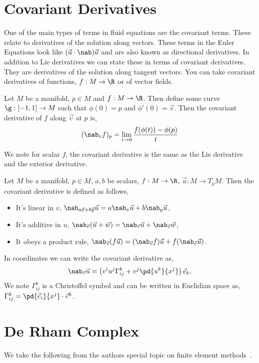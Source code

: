 \section{Covariant Derivatives}
One of the main types of terms in fluid equations are the covariant terms. These relate to derivatives of the solution along vectors. These terms in the Euler Equations look like $(\vec u \cdot \nab)\vec u$ and are also known as directional derivatives. In addition to Lie derivatives we can state these in terms of covariant derivatives. They are derivatives of the solution along tangent vectors. You can take covariant derivatives of functions, $f : M \to \R$ or of vector fields.
\begin{ndefi}
  Let $M$ be a manifold, $p \in M$ and $f : M \to \R$. Then define some curve $\g : [-1, 1] \to M$ such that $\phi(0) = p$ and $\phi'(0) = \vec v$. Then the covariant derivative of $f$ along $\vec v$ at $p$ is,
  $$ (\nab_v f)_p = \lim_{t \to 0}\frac{f(\phi(t)) - \phi(p)}{t} $$
\end{ndefi}
\noindent
We note for scalar $f$, the covariant derivative is the same as the Lie derivative and the exterior derivative.

\begin{ndefi}
  Let $M$ be a manifold, $p \in M$, $a,b$ be scalars, $f : M \to \R$, $\vec u : M \to T_pM$. Then the covariant derivative is defined as follows,
  \begin{itemize}
    \item It's linear in $v$, $\nab_{a\vec x + b\vec y}\vec u = a\nab_x\vec u + b\nab_y \vec u $,
    \item It's additive in $u$, $\nab_{\vec v} (\vec u + \vec w) = \nab_{\vec v} \vec u + \nab_{\vec v}\vec w$,
    \item It obeys a product rule, $\nab_{\vec v}(f\vec u) = (\nab_{\vec v}f)\vec u + f(\nab_{\vec v}\vec u) $.
  \end{itemize}
\end{ndefi}

\noindent
In coordinates we can write the covariant derivative as,
$$ \nab_{\vec v}\vec u = \left( v^i u^j \Gamma_{ij}^k + v^j \pd{u^k}{x^j} \right)\vec e_k. $$
We note $\Gamma_{ij}^k$ is a Christoffel symbol and can be written in Euclidian space as, $\Gamma_{ij}^k = \pd {\vec e_i}{x^j} \cdot \vec e^k$.

\section{De Rham Complex}
We take the following from the authors special topic on finite element methods~\cite{arthir_fems}. \\

